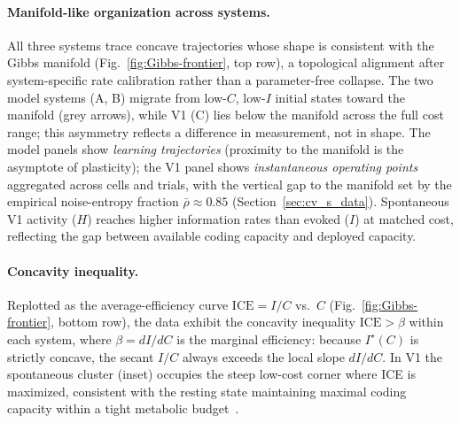 \paragraph{Manifold-like organization across systems.}
All three systems trace concave trajectories whose shape is consistent with the Gibbs manifold (Fig.~\ref{fig:Gibbs-frontier}, top row), a topological alignment after system-specific rate calibration rather than a parameter-free collapse.  The two model systems (A, B) migrate from low-$C$, low-$I$ initial states toward the manifold (grey arrows), while V1 (C) lies below the manifold across the full cost range; this asymmetry reflects a difference in measurement, not in shape.  The model panels show \emph{learning trajectories} (proximity to the manifold is the asymptote of plasticity); the V1 panel shows \emph{instantaneous operating points} aggregated across cells and trials, with the vertical gap to the manifold set by the empirical noise-entropy fraction $\bar\rho\approx 0.85$ (Section~\ref{sec:cv_s_data}).  Spontaneous V1 activity ($H$) reaches higher information rates than evoked ($I$) at matched cost, reflecting the gap between available coding capacity and deployed capacity.

\paragraph{Concavity inequality.}
Replotted as the average-efficiency curve $\mathrm{ICE}=I/C$ vs.\ $C$ (Fig.~\ref{fig:Gibbs-frontier}, bottom row), the data exhibit the concavity inequality $\mathrm{ICE}>\beta$ within each system, where $\beta=dI/dC$ is the marginal efficiency: because $I^{\star}(C)$ is strictly concave, the secant $I/C$ always exceeds the local slope $dI/dC$.  In V1 the spontaneous cluster (inset) occupies the steep low-cost corner where ICE is maximized, consistent with the resting state maintaining maximal coding capacity within a tight metabolic budget~\cite{Raichle2001}.

